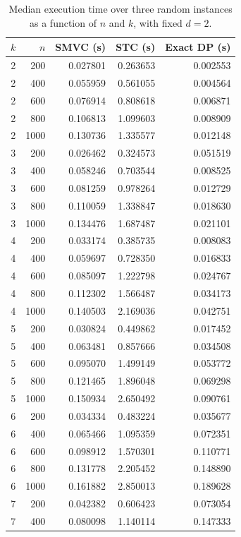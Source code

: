 \begin{table}[t]
\centering
\scriptsize
\caption{Median execution time over three random instances as a function of $n$ and $k$, with fixed $d=2$.}
\label{tab:experiment-5-runtime}
\begin{tabular}{rrrrr}
\toprule
$k$ & $n$ & SMVC (s) & STC (s) & Exact DP (s) \\
\midrule
2 & 200 & 0.027801 & 0.263653 & 0.002553 \\
2 & 400 & 0.055959 & 0.561055 & 0.004564 \\
2 & 600 & 0.076914 & 0.808618 & 0.006871 \\
2 & 800 & 0.106813 & 1.099603 & 0.008909 \\
2 & 1000 & 0.130736 & 1.335577 & 0.012148 \\
3 & 200 & 0.026462 & 0.324573 & 0.051519 \\
3 & 400 & 0.058246 & 0.703544 & 0.008525 \\
3 & 600 & 0.081259 & 0.978264 & 0.012729 \\
3 & 800 & 0.110059 & 1.338847 & 0.018630 \\
3 & 1000 & 0.134476 & 1.687487 & 0.021101 \\
4 & 200 & 0.033174 & 0.385735 & 0.008083 \\
4 & 400 & 0.059697 & 0.728350 & 0.016833 \\
4 & 600 & 0.085097 & 1.222798 & 0.024767 \\
4 & 800 & 0.112302 & 1.566487 & 0.034173 \\
4 & 1000 & 0.140503 & 2.169036 & 0.042751 \\
5 & 200 & 0.030824 & 0.449862 & 0.017452 \\
5 & 400 & 0.063481 & 0.857666 & 0.034508 \\
5 & 600 & 0.095070 & 1.499149 & 0.053772 \\
5 & 800 & 0.121465 & 1.896048 & 0.069298 \\
5 & 1000 & 0.150934 & 2.650492 & 0.090761 \\
6 & 200 & 0.034334 & 0.483224 & 0.035677 \\
6 & 400 & 0.065466 & 1.095359 & 0.072351 \\
6 & 600 & 0.098912 & 1.570301 & 0.110771 \\
6 & 800 & 0.131778 & 2.205452 & 0.148890 \\
6 & 1000 & 0.161882 & 2.850013 & 0.189628 \\
7 & 200 & 0.042382 & 0.606423 & 0.073054 \\
7 & 400 & 0.080098 & 1.140114 & 0.147333 \\

\end{tabular}
\end{table}
